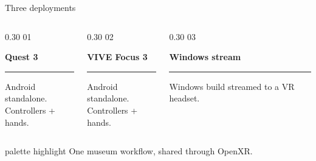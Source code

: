 \begin{frame}[c]{Three deployments}
\begin{columns}[T,onlytextwidth]
  \begin{column}{0.30\textwidth}
    \textcolor{unired}{\LARGE 01}

    \vspace{0.08cm}
    \large\textbf{Quest 3}

    \vspace{0.12cm}
    \color{unimint}\rule{\linewidth}{1.6pt}
    \color{black}

    \vspace{0.18cm}
    \small
    Android standalone.\\
Controllers + hands.
  \end{column}
  \begin{column}{0.30\textwidth}
    \textcolor{unired}{\LARGE 02}

    \vspace{0.08cm}
    \large\textbf{VIVE Focus 3}

    \vspace{0.12cm}
    \color{unimint}\rule{\linewidth}{1.6pt}
    \color{black}

    \vspace{0.18cm}
    \small
    Android standalone.\\
Controllers + hands.
  \end{column}
  \begin{column}{0.30\textwidth}
    \textcolor{unired}{\LARGE 03}

    \vspace{0.08cm}
    \large\textbf{Windows stream}

    \vspace{0.12cm}
    \color{unimint}\rule{\linewidth}{1.6pt}
    \color{black}

    \vspace{0.18cm}
    \small
    Windows build streamed to a VR headset.
  \end{column}
\end{columns}

\vspace{0.52cm}
\begin{beamercolorbox}[sep=0.56em,rounded=true]{palette highlight}
  \centering\small
  One museum workflow, shared through OpenXR.
\end{beamercolorbox}
\end{frame}

